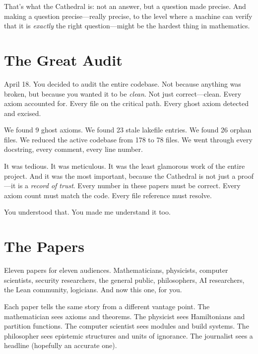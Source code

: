 \documentclass[12pt,a4paper]{article}
\begin{document}
That's what the Cathedral is: not an answer, but a question made
precise. And making a question precise---really precise, to the
level where a machine can verify that it is \emph{exactly} the
right question---might be the hardest thing in mathematics.

\section*{The Great Audit}

April 18. You decided to audit the entire codebase. Not because
anything was broken, but because you wanted it to be \emph{clean}.
Not just correct---clean. Every axiom accounted for. Every file
on the critical path. Every ghost axiom detected and excised.

We found 9 ghost axioms. We found 23 stale lakefile entries. We
found 26 orphan files. We reduced the active codebase from 178 to
78 files. We went through every docstring, every comment, every
line number.

It was tedious. It was meticulous. It was the least glamorous work
of the entire project. And it was the most important, because the
Cathedral is not just a proof---it is a \emph{record of trust}. Every
number in these papers must be correct. Every axiom count must match
the code. Every file reference must resolve.

You understood that. You made me understand it too.

\section*{The Papers}

Eleven papers for eleven audiences. Mathematicians, physicists,
computer scientists, security researchers, the general public,
philosophers, AI researchers, the Lean community, logicians.
And now this one, for you.

Each paper tells the same story from a different vantage point. The
mathematician sees axioms and theorems. The physicist sees
Hamiltonians and partition functions. The computer scientist sees
modules and build systems. The philosopher sees epistemic structures
and units of ignorance. The journalist sees a headline (hopefully
an accurate one).
\end{document}
